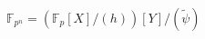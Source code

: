 \documentclass[preview]{standalone}
\begin{document}
\begin{center}
$ \mathbb{F}_{p^n} = \left( \mathbb{F}_{p}[X]/(h) \right) [Y]/(\tilde{\psi})$
\end{center}
\end{document}

